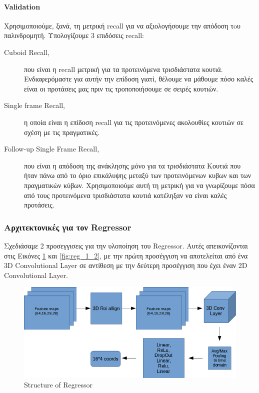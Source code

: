 \documentclass{report}
\begin{document}
\paragraph{Validation}
Χρησιμοποιούμε, ξανά, τη μετρική recall για να αξιολογήσουμε την απόδοση τoυ παλινδρομητή. Υπολογίζουμε 3 επιδόσεις recall:
\begin{description}
\item [Cuboid Recall,] που είναι η recall μετρική για τα προτεινόμενα τρισδιάστατα κουτιά. Ενδιαφερόμαστε για αυτήν την επίδοση γιατί,
  θέλουμε να μάθουμε πόσο καλές είναι οι προτάσεις μας πριν τις τροποποιήσουμε σε σειρές κουτιών.
\item [Single frame Recall,] η οποία είναι η επίδοση recall για τις προτεινόμενες ακολουθίες κουτιών σε σχέση με τις πραγματικές.
\item[Follow-up Single Frame Recall,] που είναι η απόδοση της ανάκλησης μόνο για τα τρισδιάστατα Κουτιά που ήταν πάνω από το όριο επικάλυψης μεταξύ
  των προτεινόμενων κυβων και των πραγματικών κύβων. Χρησιμοποιούμε αυτή τη μετρική για να γνωρίζουμε πόσα από τους προτεινόμενα τρισδιάστατα κουτιά
  κατέληξαν να είναι καλές προτάσεις.
\end{description}


\subsubsection{Αρχιτεκτονικές για τον Regressor} 
Σχεδιάσαμε 2 προσεγγισεις για την υλοποίηση του Regressor. Aυτές απεικονίζονται στις Εικόνες \ref{fig:regressor_3d} και \ref{fig:reg_1_2}, με την πρώτη προσέγγιση
να αποτελείται από ένα 3D Convolutional Layer σε αντίθεση με την δεύτερη προσέγγιση που έχει έναν 2D Convolutional Layer.

\begin{figure}[h]
  \centering
  \includegraphics[scale=0.48]{regressor_1_1}
  \caption{Structure of Regressor}
  \label{fig:regressor_3d}
\end{figure}
\end{document}
